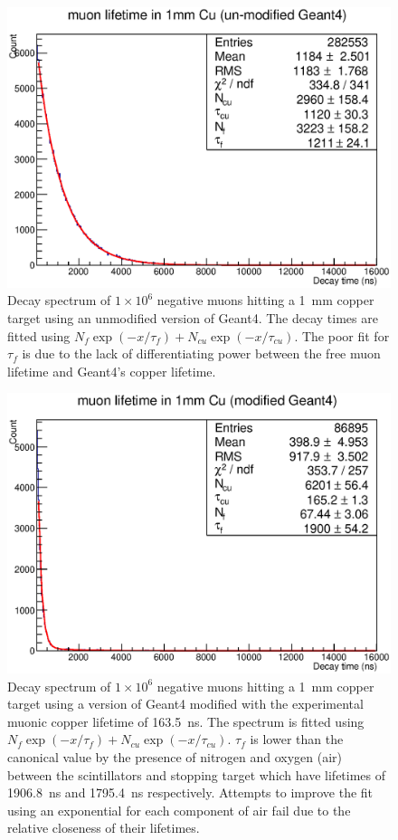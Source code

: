\begin{figure}[hptb]
  \centering
    \includegraphics[width=.7\textwidth]{images/mu-_lifetime_in_cu_unmodded_g4.eps}
  \caption{Decay spectrum of \(1\times10^6\) negative muons hitting a 1~mm copper target using an unmodified version of Geant4. The decay times are fitted using \(N_f\exp(-x/\tau_f) +  N_{cu}\exp(-x/\tau_{cu})\). The poor fit for \(\tau_f\) is due to the lack of differentiating power between the free muon lifetime and Geant4's copper lifetime.}
  \label{fig:images_mu-_lifetime_in_cu_unmodded_g4}
\end{figure}

\begin{figure}[hptb]
  \centering
    \includegraphics[width=.7\textwidth]{images/mu-_lifetime_in_cu_modded_g4.eps}
  \caption{Decay spectrum of \(1\times10^6\) negative muons hitting a 1~mm copper target using a version of Geant4 modified with the experimental muonic copper lifetime of 163.5~ns. The spectrum is fitted using \(N_f\exp(-x/\tau_f) +  N_{cu}\exp(-x/\tau_{cu})\). \(\tau_f\) is lower than the canonical value by the presence of nitrogen and oxygen (air) between the scintillators and stopping target which have lifetimes of 1906.8~ns and 1795.4~ns respectively. Attempts to improve the fit using an exponential for each component of air fail due to the relative closeness of their lifetimes.}
  \label{fig:images_mu-_lifetime_in_cu_modded_g4}
\end{figure}


